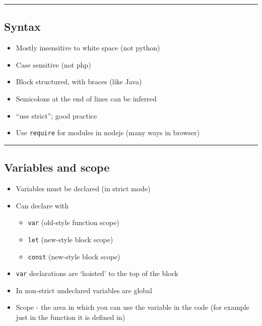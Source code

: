 \documentclass{article}[18pt]
\providecommand{\tightlist}{%
  \setlength{\itemsep}{0pt}\setlength{\parskip}{0pt}}
\begin{document}
\begin{center}\rule{0.5\linewidth}{\linethickness}\end{center}

\hypertarget{syntax}{%
\subsection{Syntax}\label{syntax}}

\begin{itemize}
\tightlist
\item
  Mostly insensitive to white space (not python)
\item
  Case sensitive (not php)
\item
  Block structured, with braces (like Java)
\item
  Semicolons at the end of lines can be inferred
\item
  ``use strict''; good practice
\item
  Use \texttt{require} for modules in nodejs (many ways in browser)
\end{itemize}

\begin{center}\rule{0.5\linewidth}{\linethickness}\end{center}

\hypertarget{variables-and-scope}{%
\subsection{Variables and scope}\label{variables-and-scope}}

\begin{itemize}
\tightlist
\item
  Variables must be declared (in strict mode)
\item
  Can declare with

  \begin{itemize}
  \tightlist
  \item
    \texttt{var} (old-style function scope)
  \item
    \texttt{let} (new-style block scope)
  \item
    \texttt{const} (new-style block scope)
  \end{itemize}
\item
  \texttt{var} declarations are `hoisted' to the top of the block
\item
  In non-strict undeclared variables are global
  \item Scope - the area in which you can use the variable in the code (for example just in the function it is defined in)
\end{itemize}
\end{document}
